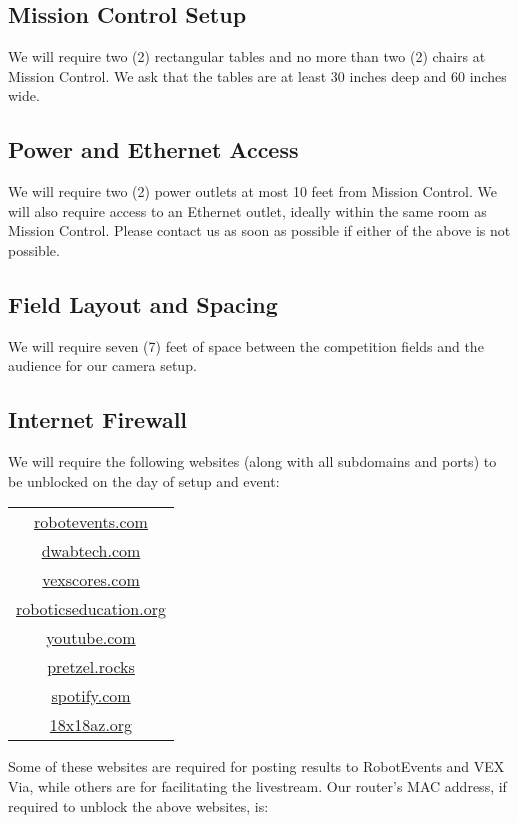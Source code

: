 \documentclass[12pt]{article}
\begin{document}
\subsection{Mission Control Setup}
We will require two (2) rectangular tables and no more than two (2) chairs at Mission Control.
We ask that the tables are at least 30 inches deep and 60 inches wide.

\subsection{Power and Ethernet Access}
We will require two (2) power outlets at most 10 feet from Mission Control.
We will also require access to an Ethernet outlet, ideally within the same room as Mission Control.
Please contact us as soon as possible if either of the above is not possible.

\subsection{Field Layout and Spacing}
We will require seven (7) feet of space between the competition fields and the audience for our camera setup.

\subsection{Internet Firewall}
We will require the following websites (along with all subdomains and ports) to be unblocked on the day of setup and event:

\begin{centering}

\begin{tabular}{|c|}
    \hline
    \url{robotevents.com} \\
    \url{dwabtech.com} \\
    \url{vexscores.com} \\
    \url{roboticseducation.org}\\
    \url{youtube.com}\\ 
        \url{pretzel.rocks} \\
        \url{spotify.com}\\
        \url{18x18az.org} \\
    \hline
\end{tabular}

\end{centering}
\vspace{1em}

\noindent Some of these websites are required for posting results to RobotEvents and VEX Via, while others are for facilitating the livestream.
Our router's MAC address, if required to unblock the above websites, is:
\end{document}
